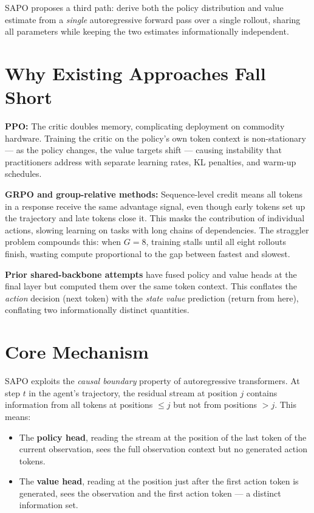 \documentclass[10pt,twocolumn]{article}
\begin{document}
SAPO proposes a third path: derive both the policy distribution and
value estimate from a \emph{single} autoregressive forward pass over
a single rollout, sharing all parameters while keeping the two
estimates informationally independent.

\section{Why Existing Approaches Fall Short}

\textbf{PPO:} The critic doubles memory, complicating deployment on
commodity hardware. Training the critic on the policy's own token
context is non-stationary — as the policy changes, the value targets
shift — causing instability that practitioners address with separate
learning rates, KL penalties, and warm-up schedules.

\textbf{GRPO and group-relative methods:} Sequence-level credit means
all tokens in a response receive the same advantage signal, even though
early tokens set up the trajectory and late tokens close it. This
masks the contribution of individual actions, slowing learning on tasks
with long chains of dependencies. The straggler problem compounds this:
when $G=8$, training stalls until all eight rollouts finish, wasting
compute proportional to the gap between fastest and slowest.

\textbf{Prior shared-backbone attempts} have fused policy and value
heads at the final layer but computed them over the same token context.
This conflates the \emph{action} decision (next token) with the
\emph{state value} prediction (return from here), conflating two
informationally distinct quantities.

\section{Core Mechanism}

SAPO exploits the \emph{causal boundary} property of autoregressive
transformers. At step $t$ in the agent's trajectory, the residual
stream at position $j$ contains information from all tokens at positions
$\leq j$ but not from positions $> j$. This means:

\begin{itemize}[itemsep=2pt,parsep=0pt]
  \item The \textbf{policy head}, reading the stream at the position
    of the last token of the current observation, sees the full
    observation context but no generated action tokens.
  \item The \textbf{value head}, reading at the position just after
    the first action token is generated, sees the observation and
    the first action token — a distinct information set.
\end{itemize}
\end{document}
